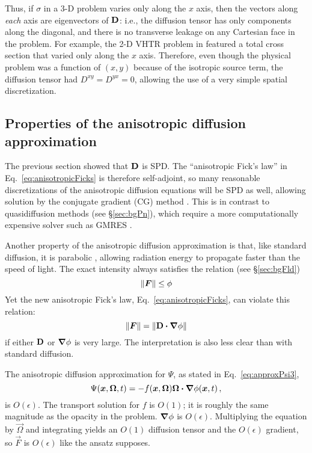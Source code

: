 Thus, if $\sigma$ in a 3-D problem varies only along
the $x$ axis, then the vectors along \emph{each} axis are
eigenvectors of $\mathbf{D}$: i.e., the diffusion tensor has only
components along the diagonal, and there is no transverse leakage on any
Cartesian face in the problem. For example, the 2-D VHTR problem in
\cite{Lar2009c} featured a total cross section that varied only along the $x$
axis. Therefore, even though the physical problem was a function of $(x,y)$
because of the isotropic source term, the diffusion tensor had
$D^{xy}=D^{yx}=0$, allowing the use of a very simple spatial discretization.

\subsection{Properties of the anisotropic diffusion approximation}

The previous section showed that $\mathbf{D}$ is SPD. The ``anisotropic Fick's law''
in Eq.~\eqref{eq:anisotropicFicks} is therefore self-adjoint, so many reasonable
discretizations of the anisotropic diffusion equations will be SPD as well,
allowing
solution by the conjugate gradient (CG) method \cite{Tre1997}. This is in
contrast to quasidiffusion methods (see \S\ref{sec:bgPn}), which require a
more computationally expensive solver such as GMRES \cite{War2003}.

Another property of the anisotropic diffusion approximation is that, like
standard diffusion, it is parabolic \cite{Pom1982,Ols2000}, allowing
radiation energy to propagate faster than the speed of light. The exact
intensity always satisfies the relation (see \S\ref{sec:bgFld})
\begin{equation*}
  \left\| \bm{F} \right\| \le \phi
\end{equation*}
Yet the new anisotropic Fick's law, Eq.~\eqref{eq:anisotropicFicks}, can violate
this relation:
\begin{equation*}
  \left\| \bm{F} \right\| = \left\| \mathbf{D} \bm{\cdot} \bm{\nabla} \phi \right\|
\end{equation*}
if either $\mathbf{D}$ or $\bm{\nabla} \phi$ is very large. The interpretation is also
less clear than with standard diffusion.

The anisotropic diffusion approximation for $\Psi$, as stated in
Eq.~\eqref{eq:approxPsi3},
\begin{equation*}
\Psi(\bm{x}, \bm{\Omega}, t) = - f(\bm{x}, \bm{\Omega})
\bm{\Omega}\bm{\cdot} \bm{\nabla} \phi(\bm{x}, t)\,,
\end{equation*}
is $O(\epsilon)$. The transport solution for $f$ is $O(1)$; it is roughly the
same magnitude as the opacity in the problem. $\bm{\nabla} \phi$ is $O(\epsilon)$.
Multiplying the equation by $\vec{\Omega}$ and integrating yields an $O(1)$
diffusion tensor and the $O(\epsilon)$ gradient, so $\vec{F}$ is $O(\epsilon)$
like the ansatz supposes.

